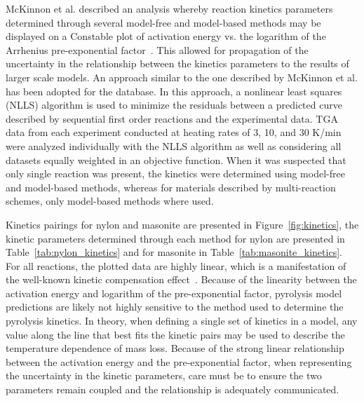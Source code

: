 \documentclass[12pt,oneside]{book}
\begin{document}
McKinnon et al. described an analysis whereby reaction kinetics parameters determined through several model-free and model-based methods may be displayed on a Constable plot of activation energy vs. the logarithm of the Arrhenius pre-exponential factor~\cite{McKinnon_ASTM}. This allowed for propagation of the uncertainty in the relationship between the kinetics parameters to the results of larger scale models. An approach similar to the one described by McKinnon et al. has been adopted for the database. In this approach, a nonlinear least squares (NLLS) algorithm is used to minimize the residuals between a predicted curve described by sequential first order reactions and the experimental data. TGA data from each experiment conducted at heating rates of 3, 10, and 30 K/min were analyzed individually with the NLLS algorithm as well as considering all datasets equally weighted in an objective function. When it was suspected that only single reaction was present, the kinetics were determined using model-free and model-based methods, whereas for materials described by multi-reaction schemes, only model-based methods where used.

Kinetics pairings for nylon and masonite are presented in Figure~\ref{fig:kinetics}, the kinetic parameters determined through each method for nylon are presented in Table~\ref{tab:nylon_kinetics} and for masonite in Table~\ref{tab:masonite_kinetics}. For all reactions, the plotted data are highly linear, which is a manifestation of the well-known kinetic compensation effect~\cite{KOGA_1994,Barrie_2012}. Because of the linearity between the activation energy and logarithm of the pre-exponential factor, pyrolysis model predictions are likely not highly sensitive to the method used to determine the pyrolysis kinetics. In theory, when defining a single set of kinetics in a model, any value along the line that best fits the kinetic pairs may be used to describe the temperature dependence of mass loss. Because of the strong linear relationship between the activation energy and the pre-exponential factor, when representing the uncertainty in the kinetic parameters, care must be to ensure the two parameters remain coupled and the relationship is adequately communicated.
\end{document}
